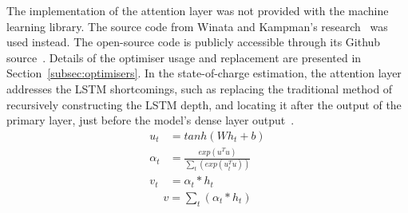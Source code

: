 %
The implementation of the attention layer was not provided with the machine learning library.
The source code from Winata and Kampman's research~\cite{winata_attention-based_2018} was used instead.
The open-source code is publicly accessible through its Github source~\cite{winata_attention-based_2018}.
Details of the optimiser usage and replacement are presented in Section~\ref{subsec:optimisers}.
In the state-of-charge estimation, the attention layer addresses the LSTM shortcomings, such as replacing the traditional method of recursively constructing the LSTM depth, and locating it after the output of the primary layer, just before the model's dense layer output~\cite{mamo_long_2020}.
\vspace{6pt}
\begin{equation}
    \begin{split}
        u_t &= tanh \left(W h_{t} + b \right) \\
        \alpha_t &= \frac{exp(u^T u)}{\sum_t(exp(u_t^T u))} \\
        v_t &= \alpha_t*h_t
    \end{split}
    \label{eq:AttentionWithContext}
\end{equation}
\begin{equation}
    \begin{split}
        v = \sum_t(\alpha_t * h_t)
    \end{split}
    \label{eq:Addition}
\end{equation}

